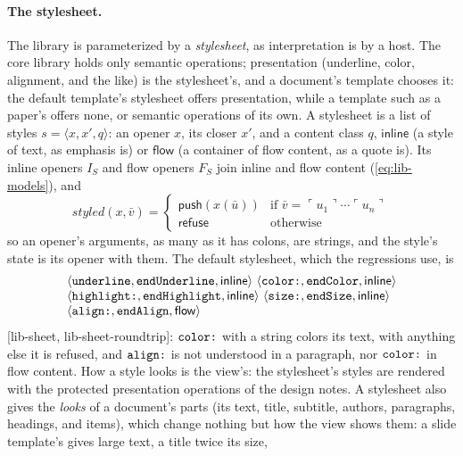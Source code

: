 \documentclass[11pt]{article}
\numberwithin{equation}{section}
\newcommand{\kw}[1]{\ensuremath{\mathsf{#1}}}
\newcommand{\str}[1]{\ensuremath{\text{\texttt{#1}}}}
\begin{document}
\paragraph{The stylesheet.}  The library is parameterized by a
\emph{stylesheet}, as interpretation is by a host.  The core library holds
only semantic operations; presentation (underline, color, alignment, and
the like) is the stylesheet's, and a document's template chooses it: the
default template's stylesheet offers presentation, while a template such as
a paper's offers none, or semantic operations of its own.  A stylesheet is a
list of styles $s = \langle x, x', q\rangle$: an opener $x$, its closer
$x'$, and a content class $q$, $\kw{inline}$ (a style of text, as emphasis
is) or $\kw{flow}$ (a container of flow content, as a quote is).  Its inline
openers $I_S$ and flow openers $F_S$ join inline and flow content
(\ref{eq:lib-models}), and
\begin{equation}\label{eq:lib-sheet}
\mathit{styled}(x, \bar v) =
\begin{cases}
\kw{push}(x(\bar u)) & \text{if } \bar v = \ulcorner u_1 \urcorner \cdots \ulcorner u_n \urcorner \\
\kw{refuse} & \text{otherwise}
\end{cases}
\end{equation}
so an opener's arguments, as many as it has colons, are strings, and the
style's state is its opener with them.  The default stylesheet, which the
regressions use, is
\[
\begin{array}{@{}l@{}}
\langle \str{underline}, \str{endUnderline}, \kw{inline}\rangle\
\langle \str{color:}, \str{endColor}, \kw{inline}\rangle \\
\langle \str{highlight:}, \str{endHighlight}, \kw{inline}\rangle\
\langle \str{size:}, \str{endSize}, \kw{inline}\rangle \\
\langle \str{align:}, \str{endAlign}, \kw{flow}\rangle
\end{array}
\]
[lib-sheet, lib-sheet-roundtrip]: $\str{color:}$ with a string colors its
text, with anything else it is refused, and $\str{align:}$ is not understood
in a paragraph, nor $\str{color:}$ in flow content.  How a style looks is
the view's: the stylesheet's styles are rendered with the protected
presentation operations of the design notes.  A stylesheet also gives the
\emph{looks} of a document's parts (its text, title, subtitle, authors,
paragraphs, headings, and items), which change nothing but how the view
shows them: a slide template's gives large text, a title twice its size,
\end{document}
